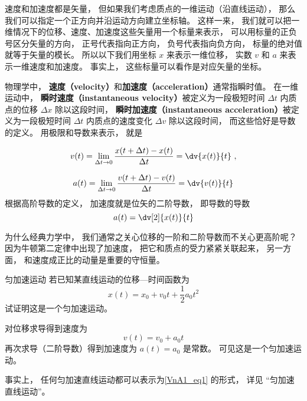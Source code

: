 

速度和加速度都是矢量， 但如果我们考虑质点的一维运动（沿直线运动）， 那么我们可以指定一个正方向并沿运动方向建立坐标轴。 这样一来， 我们就可以把一维情况下的位移、速度、加速度这些矢量用一个标量来表示， 可以用标量的正负号区分矢量的方向， 正号代表指向正方向， 负号代表指向负方向， 标量的绝对值就等于矢量的模长。 所以以下我们用坐标 $x$ 来表示一维位移， 实数 $v$ 和 $a$ 来表示一维速度和加速度。 事实上， 这些标量可以看作是对应矢量的坐标。

物理学中， \textbf{速度（velocity）}和\textbf{加速度（acceleration）}通常指瞬时值。 在一维运动中， \textbf{瞬时速度（instantaneous velocity）}被定义为一段极短时间 $\Delta t$ 内质点的位移 $\Delta x$ 除以这段时间， \textbf{瞬时加速度（instantaneous acceleration）}被定义为一段极短时间 $\Delta t$ 内质点的速度变化 $\Delta v$ 除以这段时间， 而这些恰好是导数的定义。 用极限和导数来表示， 就是

\begin{equation}
v(t) = \lim_{\Delta t\to 0} \frac{x(t+\Delta t) - x(t)}{\Delta t} = \dv{x(t)}{t}~,
\end{equation}

\begin{equation}
a(t) = \lim_{\Delta t\to 0} \frac{v(t+\Delta t) - v(t)}{\Delta t} = \dv{v(t)}{t}
\end{equation}
根据高阶导数的定义， 加速度就是位矢的二阶导数， 即导数的导数
\begin{equation}
a(t) = \dv[2]{x(t)}{t}
\end{equation}

为什么经典力学中， 我们通常之关心位移的一阶和二阶导数而不关心更高阶呢？ 因为牛顿第二定律中出现了加速度， 把它和质点的受力紧紧关联起来， 另一方面， 和速度成正比的动量是重要的守恒量。

\begin{example}{匀加速运动}\label{VnA1_ex1}
若已知某直线运动的位移—时间函数为
\begin{equation}\label{VnA1_eq1}
x(t) = x_0 + v_0 t + \frac{1}{2} a_0 t^2
\end{equation}
试证明这是一个匀加速运动。

对位移求导得到速度为
\begin{equation}
v(t) = v_0 + a_0 t
\end{equation}
再次求导（二阶导数）得到加速度为 $a(t) = a_0$ 是常数。 可见这是一个匀加速运动。
\end{example}
事实上， 任何匀加速直线运动都可以表示为\autoref{VnA1_eq1} 的形式， 详见 “匀加速直线运动”。

